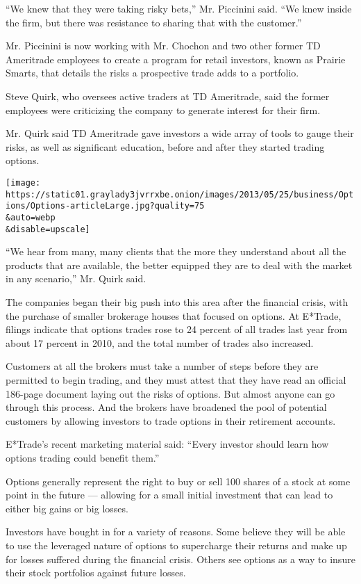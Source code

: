 ``We knew that they were taking risky bets,'' Mr. Piccinini said. ``We
knew inside the firm, but there was resistance to sharing that with the
customer.''

Mr. Piccinini is now working with Mr. Chochon and two other former TD
Ameritrade employees to create a program for retail investors, known as
Prairie Smarts, that details the risks a prospective trade adds to a
portfolio.

Steve Quirk, who oversees active traders at TD Ameritrade, said the
former employees were criticizing the company to generate interest for
their firm.

Mr. Quirk said TD Ameritrade gave investors a wide array of tools to
gauge their risks, as well as significant education, before and after
they started trading options.

\texttt{[image: https://static01.graylady3jvrrxbe.onion/images/2013/05/25/business/Options/Options-articleLarge.jpg?quality=75\\\&auto=webp\\\&disable=upscale]}

``We hear from many, many clients that the more they understand about
all the products that are available, the better equipped they are to
deal with the market in any scenario,'' Mr. Quirk said.

The companies began their big push into this area after the financial
crisis, with the purchase of smaller brokerage houses that focused on
options. At E*Trade, filings indicate that options trades rose to 24
percent of all trades last year from about 17 percent in 2010, and the
total number of trades also increased.

Customers at all the brokers must take a number of steps before they are
permitted to begin trading, and they must attest that they have read an
official 186-page document laying out the risks of options. But almost
anyone can go through this process. And the brokers have broadened the
pool of potential customers by allowing investors to trade options in
their retirement accounts.

E*Trade's recent marketing material said: ``Every investor should learn
how options trading could benefit them.''

Options generally represent the right to buy or sell 100 shares of a
stock at some point in the future --- allowing for a small initial
investment that can lead to either big gains or big losses.

Investors have bought in for a variety of reasons. Some believe they
will be able to use the leveraged nature of options to supercharge their
returns and make up for losses suffered during the financial crisis.
Others see options as a way to insure their stock portfolios against
future losses.

